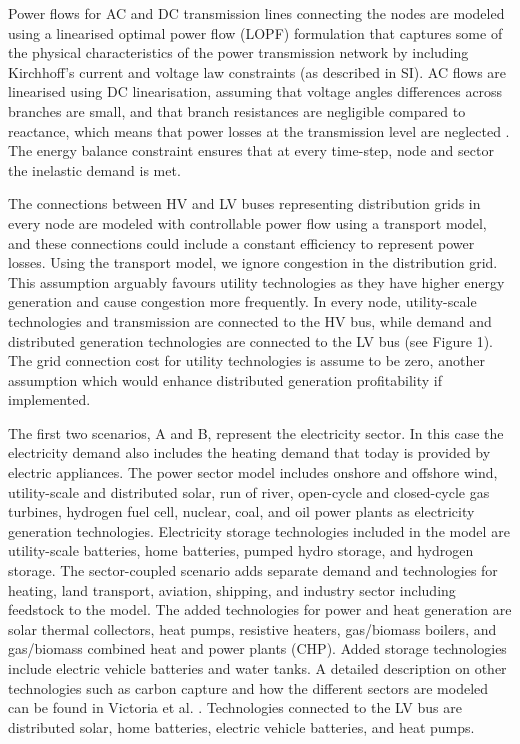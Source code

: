 \documentclass[review]{elsarticle}
\begin{document}
Power flows for AC and DC transmission lines connecting the nodes are modeled using a linearised optimal power flow (LOPF) formulation that captures some of the physical characteristics of the power transmission network by including Kirchhoff’s current and voltage law constraints (as described in SI). AC flows are linearised using DC linearisation, assuming that voltage angles differences across branches are small, and that branch resistances are negligible compared to reactance, which means that power losses at the transmission level are neglected \cite{brown_2017,neumann2022assessments,pypsa_2016}. The energy balance constraint ensures that at every time-step, node and sector the inelastic demand is met. 

The connections between HV and LV buses representing distribution grids in every node are modeled with controllable power flow using a transport model, and these connections could include a constant efficiency to represent power losses. Using the transport model, we ignore congestion in the distribution grid. This assumption arguably favours utility technologies as they have higher energy generation and cause congestion more frequently. In every node, utility-scale technologies and transmission are connected to the HV bus, while demand and distributed generation technologies are connected to the LV bus (see Figure 1). The grid connection cost for utility technologies is assume to be zero, another assumption which would enhance distributed generation profitability if implemented.

The first two scenarios, A and B, represent the electricity sector. In this case the electricity demand also includes the heating demand that today is provided by electric appliances. The power sector model includes onshore and offshore wind, utility-scale and distributed solar, run of river, open-cycle and closed-cycle gas turbines, hydrogen fuel cell, nuclear, coal, and oil power plants as electricity generation technologies. Electricity storage technologies included in the model are utility-scale batteries, home batteries, pumped hydro storage, and hydrogen storage. The sector-coupled scenario adds separate demand and technologies for heating, land transport, aviation, shipping, and industry sector including feedstock to the model. The added technologies for power and heat generation are solar thermal collectors, heat pumps, resistive heaters, gas/biomass boilers, and gas/biomass combined heat and power plants (CHP). Added storage technologies include electric vehicle batteries and water tanks. A detailed description on other technologies such as carbon capture and how the different sectors are modeled can be found in Victoria et al. \cite{victoria_2022}. Technologies connected to the LV bus are distributed solar, home batteries, electric vehicle batteries, and heat pumps.
\end{document}
